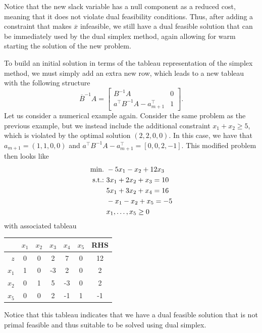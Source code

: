 Notice that the new slack variable has a null component as a reduced cost, meaning that it does not violate dual feasibility conditions. Thus, after adding a constraint that makes $\overline{x}$ infeasible, we still have a dual feasible solution that can be immediately used by the dual simplex method, again allowing for warm starting the solution of the new problem.

To build an initial solution in terms of the tableau representation of the simplex method, we must simply add an extra new row, which leads to a new tableau with the following structure
%
\begin{equation*}
	\overline{B}^{-1}A = \begin{bmatrix} B^{-1}A & 0 \\ a^\top B^{-1}A - a_{m+1}^\top & 1 \end{bmatrix}.
\end{equation*}
%		
Let us consider a numerical example again. Consider the same problem as the previous example, but we instead include the additional constraint $x_1 + x_2 \geq 5$, which is violated by the optimal solution $(2,2,0,0)$. In this case, we have that $a_{m+1} = (1,1,0,0)$ and $a^\top B^{-1} A - a^\top_{m+1} = [0, 0, 2, -1]$. This modified problem then looks like
%
\begin{align*}
	\mathop{\text{min.~}} & -5x_1 -x_2 + 12 x_3 \\
	\mathop{\text{s.t.:~}}   & 3x_1 + 2x_2 + x_3  = 10 \\
	& 5x_1 + 3x_2 + x_4 = 16 \\
	& -x_1 - x_2 + x_5 = -5  \\
	& x_1, \dots, x_5 \geq 0
\end{align*}
%
with associated tableau

\begin{center}
	\begin{tabular}{r|ccccc|c} 
	   &$x_1$ & $x_2$ & $x_3$ & $x_4$ & $x_5$ & RHS \\ \hline	
	   $z$ & 0 & 0 & 2 & 7 & 0 & 12                 \\ \hline
	   $x_1$ & 1 & 0 & -3 & 2 & 0 & 2 				\\
	   $x_2$ & 0 & 1 & 5 & -3 & 0 & 2 				\\
	   $x_5$ &  0 &  0 &  2 & -1 & 1 & -1           
	\end{tabular}
\end{center}

Notice that this tableau indicates that we have a dual feasible solution that is not primal feasible and thus suitable to be solved using dual simplex.
	
